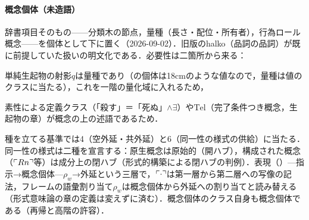 \documentclass[../../main-detail.tex]{subfiles}
\begin{document}
\paragraph{概念個体（未造語）} 辞書項目そのもの——分類木の節点，量種（長さ・配位・所有者），行為ロール概念——を個体として下に置く（2026-09-02）．旧版のhalko（品詞の品詞）が既に前提していた扱いの明文化である．必要性は二箇所から来る：
\begin{enumerate*}
    \item 単純生起物の射影$q$は量種であり（の個体は18cmのような値なので，量種は値のクラスに当たる），これを一階の量化域に入れるため，
    \item 素性による定義クラス（「殺す」＝「死ぬ」$\land\exists$）や$\mathrm{Tel}$（完了条件つき概念，生起物の章）が概念の上の述語であるため．
\end{enumerate*}
種を立てる基準では4（空外延・共外延）と6（同一性の様式の供給）に当たる．同一性の様式は二種を宣言する：原生概念は原始的（開ハブ），構成された概念（$\ulcorner Rn \urcorner$等）は成分上の閉ハブ（形式的構築による閉ハブの判例）．表現（）—指示→概念個体—$\rho_w$→外延という三層で，$\ulcorner \cdot \urcorner$は第一層から第二層への写像の記法，フレームの語彙割り当て$\rho_w$は概念個体から外延への割り当てと読み替える（形式意味論の章の定義は変えずに済む）．概念個体のクラス自身も概念個体である（再帰と高階の許容）．
\end{document}
